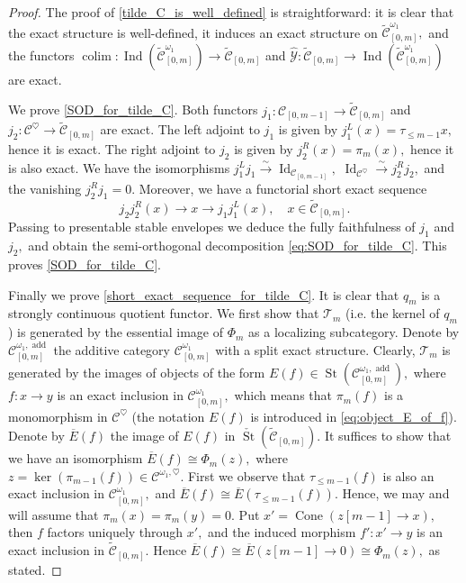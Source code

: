 \documentclass[11pt,leqno]{amsart}
\numberwithin{equation}{section}
\def\wt{\widetilde}
\DeclareMathOperator*{\colim}{colim}
\newcommand{\bbar}{\overline}
\newcommand{\xto}{\xrightarrow}
\newcommand{\Cone}{\operatorname{Cone}}
\newcommand{\St}{\operatorname{St}}
\newcommand{\cC}{{\mathcal C}}
\newcommand{\cY}{{\mathcal Y}}
\newcommand{\cT}{{\mathcal T}}
\newcommand{\Id}{\operatorname{Id}}
\newcommand{\add}{\operatorname{add}}
\newcommand{\Ind}{\operatorname{Ind}}
\begin{document}
\begin{proof}
The proof of \ref{tilde_C_is_well_defined} is straightforward: it is clear that the exact structure is well-defined, it induces an exact structure on $\wt{\cC}^{\omega_1}_{[0,m]},$ and the functors $\colim:\Ind(\wt{\cC}^{\omega_1}_{[0,m]})\to \wt{\cC}_{[0,m]}$ and $\hat{\cY}:\wt{\cC}_{[0,m]}\to \Ind(\wt{\cC}^{\omega_1}_{[0,m]})$ are exact.

We prove \ref{SOD_for_tilde_C}. Both functors $j_1:\cC_{[0,m-1]}\to \wt{\cC}_{[0,m]}$ and $j_2:\cC^{\heartsuit}\to \wt{\cC}_{[0,m]}$ are exact. The left adjoint to $j_1$ is given by $j_1^L(x)=\tau_{\leq m-1} x,$ hence it is exact. The right adjoint to $j_2$ is given by $j_2^R(x)=\pi_m(x),$ hence it is also exact. We have the isomorphisms $j_1^L j_1\xto{\sim}\Id_{\cC_{[0,m-1]}},$ $\Id_{\cC^{\heartsuit}}\xto{\sim} j_2^R j_2,$ and the vanishing $j_2^Rj_1=0.$ Moreover, we have a functorial short exact sequence
\begin{equation*}
j_2 j_2^R(x)\to x\to j_1 j_1^L(x),\quad x\in\wt{\cC}_{[0,m]}.
\end{equation*} 
Passing to presentable stable envelopes we deduce the fully faithfulness of $j_1$ and $j_2,$ and obtain the semi-orthogonal decomposition \eqref{eq:SOD_for_tilde_C}. This proves \ref{SOD_for_tilde_C}.

Finally we prove \ref{short_exact_sequence_for_tilde_C}. It is clear that $q_m$ is a strongly continuous quotient functor. We first show that $\cT_m$ (i.e. the kernel of $q_m$) is generated by the essential image of $\Phi_m$ as a localizing subcategory. Denote by $\cC_{[0,m]}^{\omega_1,\add}$ the additive category $\cC_{[0,m]}^{\omega_1}$ with a split exact structure. Clearly, $\cT_m$ is generated by the images of objects of the form $E(f)\in\St(\cC_{[0,m]}^{\omega_1,\add}),$ where  $f:x\to y$ is an exact inclusion in $\cC^{\omega_1}_{[0,m]},$ which means that $\pi_m(f)$ is a monomorphism in $\cC^{\heartsuit}$ (the notation $E(f)$ is introduced in \eqref{eq:object_E_of_f}). Denote by $\bbar{E}(f)$ the image of $E(f)$ in $\check{\St}(\wt{\cC}_{[0,m]}).$ It suffices to show that we have an isomorphism $\bbar{E}(f)\cong \Phi_m(z),$ where $z=\ker(\pi_{m-1}(f))\in\cC^{\omega_1,\heartsuit}.$ First we observe that $\tau_{\leq m-1}(f)$ is also an exact inclusion in $\cC^{\omega_1}_{[0,m]},$ and $\bbar{E}(f)\cong \bbar{E}(\tau_{\leq m-1}(f)).$ Hence, we may and will assume that $\pi_m(x)=\pi_m(y)=0.$ Put $x'=\Cone(z[m-1]\to x),$ then $f$ factors uniquely through $x',$ and the induced morphism $f':x'\to y$ is an exact inclusion in $\wt{\cC}_{[0,m]}.$ Hence $\bbar{E}(f)\cong\bbar{E}(z[m-1]\to 0)\cong \Phi_m(z),$ as stated.


\end{proof}
\end{document}
